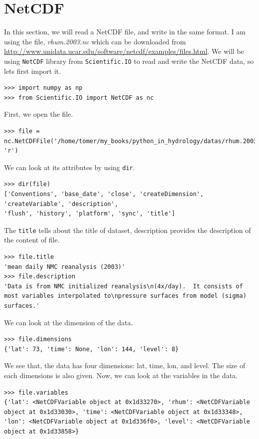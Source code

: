 \documentclass[10pt]{book}
\begin{document}
\section{NetCDF}
In this section, we will read a NetCDF file, and write in the same format. I am using the file, \emph{rhum.2003.nc} which can be downloaded from \url{http://www.unidata.ucar.edu/software/netcdf/examples/files.html}. We will be using \verb"NetCDF" library from \verb"Scientific.IO" to read and write the NetCDF data, so lets first import it.
\beforeverb \begin{verbatim}
>>> import numpy as np
>>> from Scientific.IO import NetCDF as nc
\end{verbatim} \afterverb

First, we open the file. 
\beforeverb \begin{verbatim}
>>> file = nc.NetCDFFile('/home/tomer/my_books/python_in_hydrology/datas/rhum.2003.nc', 'r')
\end{verbatim} \afterverb

We can look at its attributes by using \verb"dir".
\beforeverb \begin{verbatim}
>>> dir(file)
['Conventions', 'base_date', 'close', 'createDimension', 'createVariable', 'description', 
'flush', 'history', 'platform', 'sync', 'title']
\end{verbatim} \afterverb

The \verb"title" tells about the title of dataset, description provides the description of the content of file. 
\beforeverb \begin{verbatim}
>>> file.title
'mean daily NMC reanalysis (2003)'
>>> file.description
'Data is from NMC initialized reanalysis\n(4x/day).  It consists of most variables interpolated to\npressure surfaces from model (sigma) surfaces.'
\end{verbatim} \afterverb

We can look at the dimension of the data.
\beforeverb \begin{verbatim}
>>> file.dimensions
{'lat': 73, 'time': None, 'lon': 144, 'level': 8}
\end{verbatim} \afterverb
We see that, the data has four dimensions: lat, time, lon, and level. The size of each dimensions is also given. Now, we can look at the variables in the data.

\beforeverb \begin{verbatim}
>>> file.variables
{'lat': <NetCDFVariable object at 0x1d33270>, 'rhum': <NetCDFVariable object at 0x1d33030>, 'time': <NetCDFVariable object at 0x1d33348>, 'lon': <NetCDFVariable object at 0x1d336f0>, 'level': <NetCDFVariable object at 0x1d33858>}
\end{verbatim} \afterverb
\end{document}
